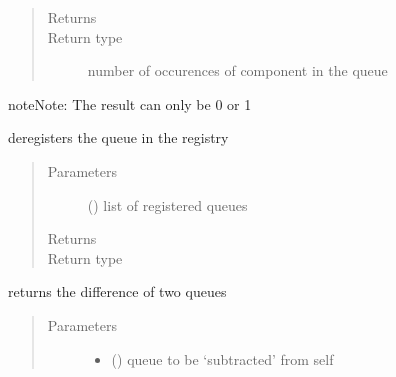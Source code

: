 \documentclass[letterpaper,10pt,english]{sphinxmanual}
\begin{document}
\begin{fulllineitems}
\begin{fulllineitems}
\begin{quote}
\begin{description}
\item[{Returns}] \leavevmode


\item[{Return type}] \leavevmode
number of occurences of component in the queue

\end{description}\end{quote}

\begin{sphinxadmonition}{note}{Note:}
The result can only be 0 or 1
\end{sphinxadmonition}

\end{fulllineitems}


\begin{fulllineitems}
\label{\detokenize{Reference:salabim.Queue.deregister}}
deregisters the queue in the registry
\begin{quote}\begin{description}
\item[{Parameters}] \leavevmode
{} () \textendash{} list of registered queues

\item[{Returns}] \leavevmode
{}

\item[{Return type}] \leavevmode
{\hyperref[\detokenize{Reference:salabim.Queue}]{}}

\end{description}\end{quote}

\end{fulllineitems}


\begin{fulllineitems}
\label{\detokenize{Reference:salabim.Queue.difference}}
returns the difference of two queues
\begin{quote}\begin{description}
\item[{Parameters}] \leavevmode\begin{itemize}
\item {} 
 ({\hyperref[\detokenize{Reference:salabim.Queue}]{}}) \textendash{} queue to be ‘subtracted’ from self


\end{itemize}
\end{description}
\end{quote}
\end{fulllineitems}
\end{fulllineitems}
\end{document}
